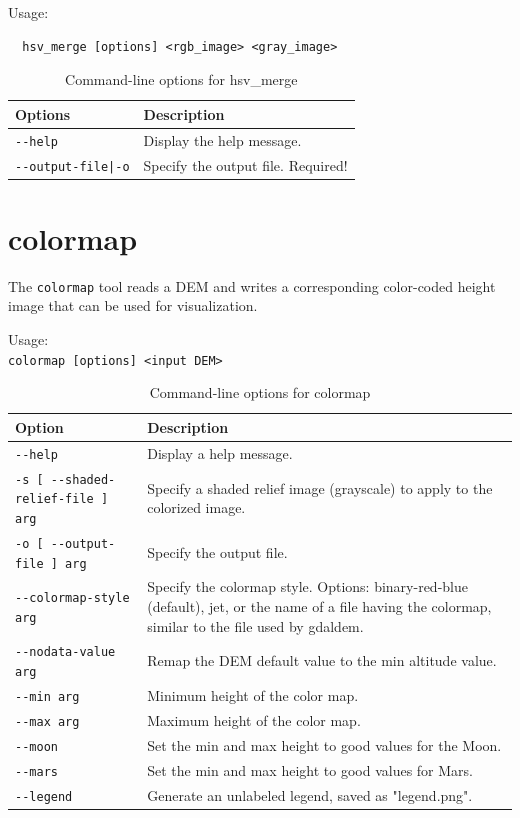 Usage:
\begin{verbatim}
  hsv_merge [options] <rgb_image> <gray_image>
\end{verbatim}

\medskip

\begin{longtable}{|l|p{10cm}|}
\caption{Command-line options for hsv\_merge}
\label{tbl:hsvmerge}
\endfirsthead
\endhead
\endfoot
\endlastfoot
\hline
Options & Description \\ \hline \hline
\texttt{-\/-help} & Display the help message.\\ \hline
\texttt{-\/-output-file|-o} & Specify the output file.  Required!\\ \hline
\end{longtable}


\section{colormap}
\label{sec:colormap}

The \verb#colormap# tool reads a DEM and writes a corresponding color-coded height image that can be used for visualization.


\medskip

Usage:\\
\hspace*{2em}\texttt{colormap [options] <input DEM>}

\medskip


\begin{longtable}{|l|p{10cm}|}
\caption{Command-line options for colormap}
\label{tbl:colormap}
\endfirsthead
\endhead
\endfoot
\endlastfoot
\hline
Option & Description \\ \hline \hline
\verb#--help# & Display a help message. \\ \hline
\verb#-s [ --shaded-relief-file ] arg# & Specify a shaded relief image (grayscale) to apply to the colorized image. \\ \hline
\verb#-o [ --output-file ] arg# & Specify the output file. \\ \hline
\verb#--colormap-style arg# & Specify the colormap style. Options: binary-red-blue (default), jet, or the name of a file having the colormap, similar to the file used by gdaldem. \\ \hline
\verb#--nodata-value arg# & Remap the DEM default value to the min altitude value. \\ \hline
\verb#--min arg# & Minimum height of the color map. \\ \hline
\verb#--max arg# & Maximum height of the color map. \\ \hline
\verb#--moon# & Set the min and max height to good values for the Moon. \\ \hline
\verb#--mars# & Set the min and max height to good values for Mars. \\ \hline
\verb#--legend# & Generate an unlabeled legend, saved as "legend.png". \\ \hline

\end{longtable}

